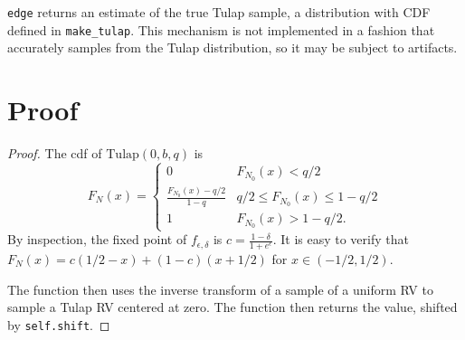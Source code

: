 \documentclass{article}
\begin{document}
\texttt{edge} returns an estimate of the true Tulap sample,
a distribution with CDF defined in \texttt{make\_tulap}.
This mechanism is not implemented in a fashion that accurately samples from the Tulap distribution,
so it may be subject to artifacts.

\section{Proof}

\begin{proof} 

The cdf of $\mathrm{Tulap}(0,b,q)$ is
\[F_N(x) = \begin{cases}
    0&F_{N_0}(x)<q/2\\
    \frac{F_{N_0}(x)-q/2}{1-q}& q/2\leq F_{N_0}(x)\leq 1-q/2\\
    1&F_{N_0}(x)>1-q/2.
\end{cases}\]
By inspection, the fixed point of $f_{\epsilon,\delta}$ is $c=\frac{1-\delta}{1+e^\epsilon}$. 
It is easy to verify that $F_N(x) = c(1/2-x) + (1-c)(x+1/2)$ for $x\in (-1/2,1/2)$. 

The function then uses the inverse transform of a sample of a uniform RV to sample a Tulap RV centered at zero.
The function then returns the value, shifted by \texttt{self.shift}.


\end{proof}
\end{document}

